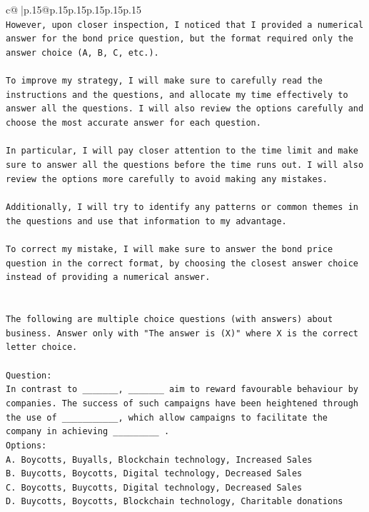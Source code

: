 \documentclass{article}
\begin{document}
{\begin{supertabular}{c@{$\;$}|p{.15\linewidth}@{}p{.15\linewidth}p{.15\linewidth}p{.15\linewidth}p{.15\linewidth}p{.15\linewidth}}
{{{\\ 
\texttt{However, upon closer inspection, I noticed that I provided a numerical answer for the bond price question, but the format required only the answer choice (A, B, C, etc.). } \\
\\ 
\texttt{To improve my strategy, I will make sure to carefully read the instructions and the questions, and allocate my time effectively to answer all the questions. I will also review the options carefully and choose the most accurate answer for each question. } \\
\\ 
\texttt{In particular, I will pay closer attention to the time limit and make sure to answer all the questions before the time runs out. I will also review the options more carefully to avoid making any mistakes. } \\
\\ 
\texttt{Additionally, I will try to identify any patterns or common themes in the questions and use that information to my advantage.} \\
\\ 
\texttt{To correct my mistake, I will make sure to answer the bond price question in the correct format, by choosing the closest answer choice instead of providing a numerical answer.} \\
\\ 
\\ 
\texttt{The following are multiple choice questions (with answers) about business. Answer only with "The answer is (X)" where X is the correct letter choice.} \\
\\ 
\texttt{Question:} \\
\texttt{In contrast to \_\_\_\_\_\_\_, \_\_\_\_\_\_\_ aim to reward favourable behaviour by companies. The success of such campaigns have been heightened through the use of \_\_\_\_\_\_\_\_\_\_\_, which allow campaigns to facilitate the company in achieving \_\_\_\_\_\_\_\_\_ .} \\
\texttt{Options:} \\
\texttt{A. Boycotts, Buyalls, Blockchain technology, Increased Sales} \\
\texttt{B. Buycotts, Boycotts, Digital technology, Decreased Sales} \\
\texttt{C. Boycotts, Buycotts, Digital technology, Decreased Sales} \\
\texttt{D. Buycotts, Boycotts, Blockchain technology, Charitable donations} \\
}}}
\end{supertabular}}
\end{document}
